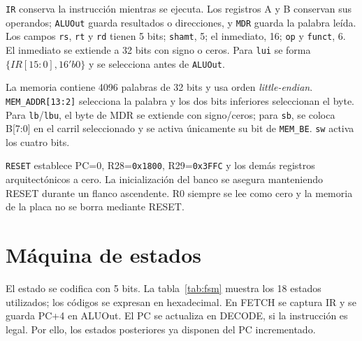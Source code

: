\documentclass[11pt,a4paper]{article}
\newcommand{\sig}[1]{\texttt{#1}}
\begin{document}
\begin{center}
{
}
\label{fig:memoria}
\end{center}

\sig{IR} conserva la instrucción mientras se ejecuta. Los registros A y B
conservan sus operandos; \sig{ALUOut} guarda resultados o direcciones, y
\sig{MDR} guarda la palabra leída. Los campos \sig{rs}, \sig{rt} y \sig{rd}
tienen 5 bits; \sig{shamt}, 5; el inmediato, 16; \sig{op} y \sig{funct}, 6.
El inmediato se extiende a 32 bits con signo o ceros. Para \sig{lui} se forma
$\{IR[15{:}0],16'b0\}$ y se selecciona antes de \sig{ALUOut}.

La memoria contiene 4096 palabras de 32 bits y usa orden \emph{little-endian}.
\sig{MEM\_ADDR[13:2]} selecciona la palabra y los dos bits inferiores
seleccionan el byte. Para \sig{lb}/\sig{lbu}, el byte de MDR se extiende con
signo/ceros; para \sig{sb}, se coloca B[7:0] en el carril seleccionado y se
activa únicamente su bit de \sig{MEM\_BE}. \sig{sw} activa los cuatro bits.

\sig{RESET} establece PC=0, R28=\sig{0x1800}, R29=\sig{0x3FFC} y los demás
registros arquitectónicos a cero. La inicialización del banco se asegura
manteniendo RESET durante un flanco ascendente. R0 siempre se lee como cero
y la memoria de la placa no se borra mediante RESET.

\clearpage
\section{Máquina de estados}

El estado se codifica con 5 bits. La tabla~\ref{tab:fsm} muestra los 18 estados
utilizados; los códigos se expresan en hexadecimal. En FETCH se captura IR y
se guarda PC+4 en ALUOut. El PC se actualiza en DECODE, si la instrucción es
legal. Por ello, los estados posteriores ya disponen del PC incrementado.
\end{document}
